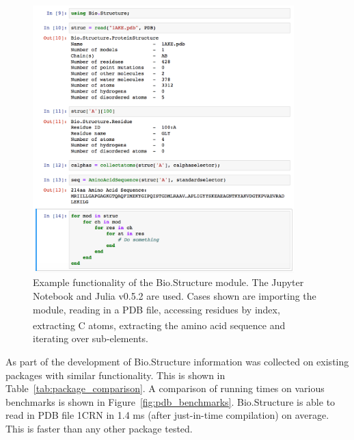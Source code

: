 \begin{figure}
\centering

\includegraphics[width=0.9\textwidth]{figures/biojulia_example/biojulia_example}

\caption{Example functionality of the Bio.Structure module.
The Jupyter Notebook and Julia v0.5.2 are used.
Cases shown are importing the module, reading in a PDB file, accessing residues by index, extracting C\textsuperscript{\textalpha} atoms, extracting the amino acid sequence and iterating over sub-elements.}

\label{fig:biojulia_example}
\end{figure}


As part of the development of Bio.Structure information was collected on existing packages with similar functionality.
This is shown in Table~\ref{tab:package_comparison}.
A comparison of running times on various benchmarks is shown in Figure~\ref{fig:pdb_benchmarks}.
Bio.Structure is able to read in PDB file 1CRN in 1.4 ms (after just-in-time compilation) on average.
This is faster than any other package tested.



